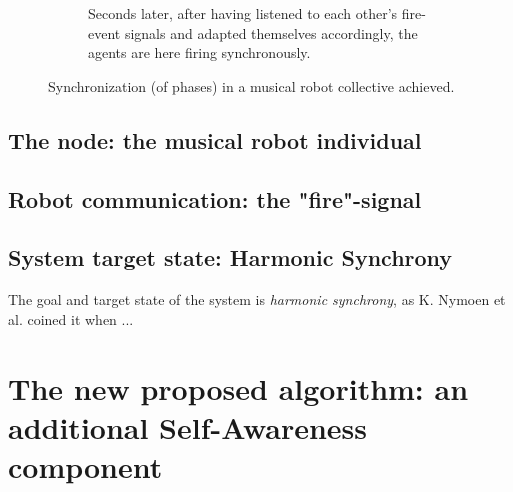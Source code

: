 \begin{figure}[h]
\begin{subfigure}[t]{.5\textwidth}
			\caption{Seconds later, after having listened to each other's fire-event signals and adapted themselves accordingly, the agents are here firing synchronously.}
			\label{initial:synch}
		\end{subfigure}
	\caption{Synchronization (of phases) in a musical robot collective achieved. }	%
	\label{initial}
\end{figure}


\subsection{The node: the musical robot individual}

\subsection{Robot communication: the "fire"-signal}

\subsection{System target state: Harmonic Synchrony}

The goal and target state of the system is \textit{harmonic synchrony}, as K. Nymoen et al. \cite{nymoen_synch} coined it when ...




\section{The new proposed algorithm: an additional Self-Awareness component}









